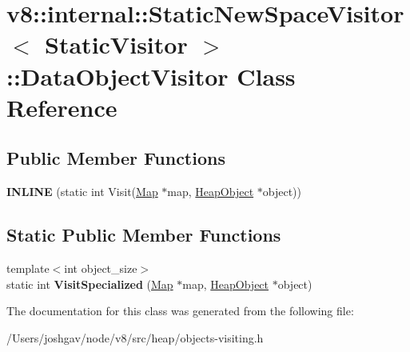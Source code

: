 \hypertarget{classv8_1_1internal_1_1_static_new_space_visitor_1_1_data_object_visitor}{}\section{v8\+:\+:internal\+:\+:Static\+New\+Space\+Visitor$<$ Static\+Visitor $>$\+:\+:Data\+Object\+Visitor Class Reference}
\label{classv8_1_1internal_1_1_static_new_space_visitor_1_1_data_object_visitor}
\subsection*{Public Member Functions}
\begin{DoxyCompactItemize}
\item 
{\bfseries I\+N\+L\+I\+NE} (static int Visit(\hyperlink{classv8_1_1internal_1_1_map}{Map} $\ast$map, \hyperlink{classv8_1_1internal_1_1_heap_object}{Heap\+Object} $\ast$object))\hypertarget{classv8_1_1internal_1_1_static_new_space_visitor_1_1_data_object_visitor_a840a813eaac0099c7f13166bf711e217}{}\label{classv8_1_1internal_1_1_static_new_space_visitor_1_1_data_object_visitor_a840a813eaac0099c7f13166bf711e217}

\end{DoxyCompactItemize}
\subsection*{Static Public Member Functions}
\begin{DoxyCompactItemize}
\item 
{\footnotesize template$<$int object\+\_\+size$>$ }\\static int {\bfseries Visit\+Specialized} (\hyperlink{classv8_1_1internal_1_1_map}{Map} $\ast$map, \hyperlink{classv8_1_1internal_1_1_heap_object}{Heap\+Object} $\ast$object)\hypertarget{classv8_1_1internal_1_1_static_new_space_visitor_1_1_data_object_visitor_a0d593334355f65c748e9c0af42855640}{}\label{classv8_1_1internal_1_1_static_new_space_visitor_1_1_data_object_visitor_a0d593334355f65c748e9c0af42855640}

\end{DoxyCompactItemize}


The documentation for this class was generated from the following file\+:\begin{DoxyCompactItemize}
\item 
/\+Users/joshgav/node/v8/src/heap/objects-\/visiting.\+h\end{DoxyCompactItemize}
